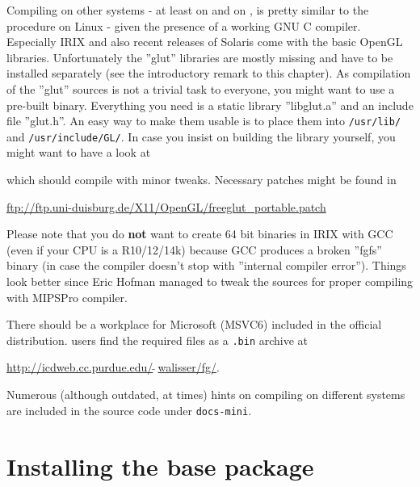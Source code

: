 Compiling on other  systems - at least on  and on
, is pretty similar to the procedure on Linux - given the presence of a working GNU C compiler. Especially IRIX and also recent releases of Solaris come with the
basic OpenGL libraries. Unfortunately the ''glut'' libraries are
mostly missing and have to be installed separately (see the introductory remark to this chapter). As compilation
of the ''glut'' sources is not a trivial task to everyone, you might want to use a
pre-built binary. Everything you need is a static library ''libglut.a'' and an include
file ''glut.h''. An easy way to make them usable is to place them into \texttt{/usr/lib/}
and \texttt{/usr/include/GL/}. In case you insist on building the library yourself, you
might want to have a look at 
\medskip

 \medskip

 \noindent
which should compile with minor tweaks. Necessary patches might be found in
\medskip

\href{ftp://ftp.uni-duisburg.de/X11/OpenGL/freeglut_portable.patch}{ftp://ftp.uni-duisburg.de/X11/OpenGL/freeglut\_portable.patch}
 \medskip

 \noindent
Please note that you do \textbf{not} want to create 64 bit binaries in IRIX
with GCC (even if your CPU is a R10/12/14k) because GCC produces a broken
''fgfs'' binary (in case the compiler doesn't stop with ''internal compiler
error''). Things look better since Eric Hofman
managed to tweak the \FlightGear{} sources for proper compiling with MIPSPro
compiler.

There should be a workplace for Microsoft  (MSVC6) included in the official
\FlightGear{} distribution.  users find the required 
files as a \texttt{.bin} archive at
 \medskip

\href{http://icdweb.cc.purdue.edu/~walisser/fg/}{http://icdweb.cc.purdue.edu/$\tilde{~~}$walisser/fg/}.

Numerous (although outdated, at times) hints on compiling on different systems are included in the source code under \texttt{docs-mini}.

\section{Installing the base package}

